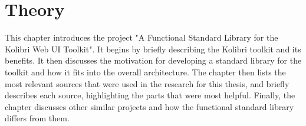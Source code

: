 \chapter{Theory}
\label{chap:theory}
This chapter introduces the project "A Functional Standard Library for the
Kolibri Web UI Toolkit". It begins by briefly describing the Kolibri toolkit
and its benefits. It then discusses the motivation for developing a standard
library for the toolkit and how it fits into the overall architecture. The
chapter then lists the most relevant sources that were used in the research for
this thesis, and briefly describes each source, highlighting the parts that
were most helpful. Finally, the chapter discusses other similar projects and
how the functional standard library differs from them.



